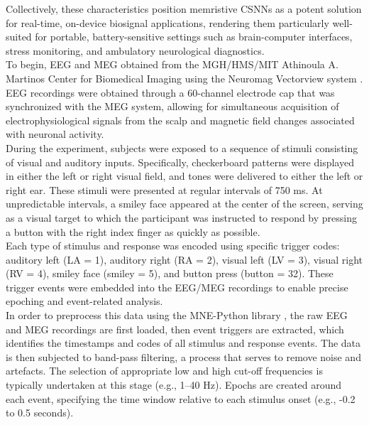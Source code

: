 \noindent Collectively, these characteristics position memristive CSNNs as a potent solution for real-time, on-device biosignal applications, rendering them particularly well-suited for portable, battery-sensitive settings such as brain-computer interfaces, stress monitoring, and ambulatory neurological diagnostics.\\

\noindent To begin, EEG and MEG obtained from the MGH/HMS/MIT Athinoula A. Martinos Center for Biomedical Imaging using the Neuromag Vectorview system \cite{Gramfort2020-jm}. EEG recordings were obtained through a 60-channel electrode cap that was synchronized with the MEG system, allowing for simultaneous acquisition of electrophysiological signals from the scalp and magnetic field changes associated with neuronal activity. \\


\noindent During the experiment, subjects were exposed to a sequence of stimuli consisting of visual and auditory inputs. Specifically, checkerboard patterns were displayed in either the left or right visual field, and tones were delivered to either the left or right ear. These stimuli were presented at regular intervals of 750 ms. At unpredictable intervals, a smiley face appeared at the center of the screen, serving as a visual target to which the participant was instructed to respond by pressing a button with the right index finger as quickly as possible.\\

\noindent Each type of stimulus and response was encoded using specific trigger codes: auditory left (LA = 1), auditory right (RA = 2), visual left (LV = 3), visual right (RV = 4), smiley face (smiley = 5), and button press (button = 32). These trigger events were embedded into the EEG/MEG recordings to enable precise epoching and event-related analysis.\\

\noindent In order to preprocess this data using the MNE-Python library \cite{gramfort2014mne}, the raw EEG and MEG recordings are first loaded, then event triggers are extracted, which identifies the timestamps and codes of all stimulus and response events. The data is then subjected to band-pass filtering, a process that serves to remove noise and artefacts. The selection of appropriate low and high cut-off frequencies is typically undertaken at this stage (e.g., 1–40 Hz). Epochs are created around each event, specifying the time window relative to each stimulus onset (e.g., -0.2 to 0.5 seconds).\\

